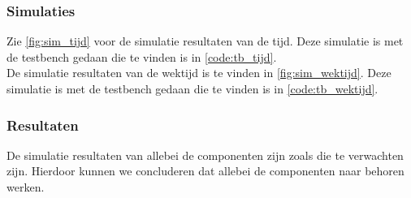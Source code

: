 \subsubsection{Simulaties}
Zie \ref{fig:sim_tijd} voor de simulatie resultaten van de tijd. Deze simulatie is met de testbench gedaan die te vinden is in \ref{code:tb_tijd}.\\
De simulatie resultaten van de wektijd is te vinden in \ref{fig:sim_wektijd}. Deze simulatie is met de testbench gedaan die te vinden is in \ref{code:tb_wektijd}.

\subsubsection{Resultaten}
De simulatie resultaten van allebei de componenten zijn zoals die te verwachten zijn. Hierdoor kunnen we concluderen dat allebei de componenten naar behoren werken.


